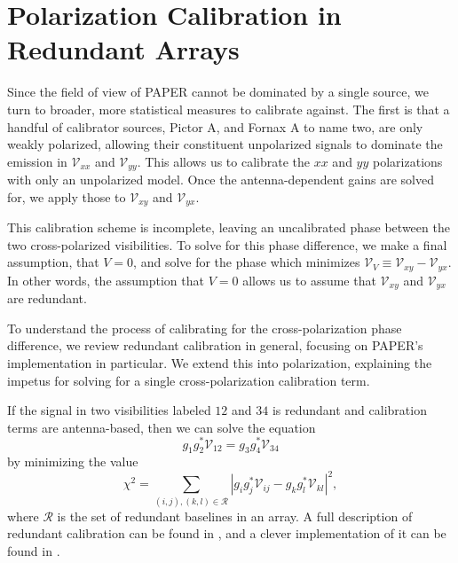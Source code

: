 \section{Polarization Calibration in Redundant Arrays}\label{sec:redcal}

Since the field of view of PAPER cannot be dominated by a single source, we turn to broader, more
statistical measures to calibrate against. The first is that a handful of calibrator sources,
Pictor A, and Fornax A to name two, are only weakly polarized, allowing their constituent
unpolarized signals to dominate the emission in $\mathcal{V}_{xx}$ and $\mathcal{V}_{yy}$. This
allows us to calibrate the $xx$ and $yy$ polarizations with only an unpolarized model. Once the
antenna-dependent gains are solved for, we apply those to $\mathcal{V}_{xy}$ and $\mathcal{V}_{yx}$.

This calibration scheme is incomplete, leaving an uncalibrated phase between the two
cross-polarized visibilities. To solve for this phase difference, we make a final assumption, that
$V=0$, and solve for the phase which minimizes $\mathcal{V}_V \equiv
\mathcal{V}_{xy}-\mathcal{V}_{yx}$. In other words, the assumption that $V=0$ allows us to assume
that $\mathcal{V}_{xy}$ and $\mathcal{V}_{yx}$ are redundant.

To understand the process of calibrating for the cross-polarization phase difference, we review
redundant calibration in general, focusing on PAPER's implementation in particular. We extend this
into polarization, explaining the impetus for solving for a single cross-polarization calibration
term.

If the signal in two visibilities labeled $12$ and $34$ is redundant and calibration terms are 
antenna-based, then we can solve the equation 
\begin{equation}
  g_1g^*_2\mathcal{V}_{12} = g_3g_4^*\mathcal{V}_{34}
\end{equation}
by minimizing the value
\begin{equation}
  \chi^2 = \sum_{(i,j),(k,l)\in\mathcal{R}}
    \left|g_ig_j^*\mathcal{V}_{ij} - g_kg_l^*\mathcal{V}_{kl}\right|^2,
    \label{eq:def_redcal}
\end{equation}
where $\mathcal{R}$ is the set of redundant baselines 
in an array. A full description of redundant calibration can be found in \citet{Liu2010}, and a
clever implementation of it can be found in \citet{Zheng2014}.



